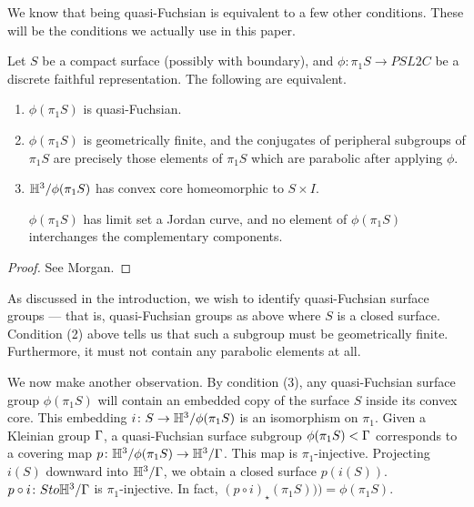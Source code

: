 We know that being quasi-Fuchsian is equivalent to a few other conditions.
These will be the conditions we actually use in this paper.

\begin{prop}

Let $S$ be a compact surface (possibly with boundary), and $\phi \colon \pi_1S
\to PSL2C$ be a discrete faithful representation. The following are equivalent.

\begin{enumerate}

\item $\phi(\pi_1S)$ is quasi-Fuchsian.

\item $\phi(\pi_1S)$ is geometrically finite, and the conjugates of peripheral
subgroups of $\pi_1S$ are precisely those elements of $\pi_1S$ which are
parabolic after applying $\phi$.

\item $\mathbb{H}^3/\phi(\pi_1S)$ has convex core homeomorphic to $S \times I$.

$\phi(\pi_1S)$ has limit set a Jordan curve, and no element of $\phi(\pi_1S)$
interchanges the complementary components.

\end{enumerate}

\end{prop}

\begin{proof}

See Morgan.%

\end{proof}

As discussed in the introduction, we wish to identify quasi-Fuchsian surface
groups --- that is, quasi-Fuchsian groups as above where $S$ is a closed
surface.  Condition (2) above tells us that such a subgroup must be
geometrically finite.  Furthermore, it must not contain any parabolic elements
at all.

We now make another observation. By condition (3), any quasi-Fuchsian surface
group $\phi(\pi_1S)$ will contain an embedded copy of the surface $S$ inside
its convex core.  This embedding $i \colon S \to \mathbb{H}^3/\phi(\pi_1S)$ is an
isomorphism on $\pi_1$.  Given a Kleinian group $\Gamma$, a quasi-Fuchsian surface
subgroup $\phi(\pi_1S) < \Gamma$ corresponds to a covering map $p \colon
\mathbb{H}^3/\phi(\pi_1S) \to \mathbb{H}^3/\Gamma$. This map is $\pi_1$-injective.  Projecting
$i(S)$ downward into $\mathbb{H}^3/\Gamma$, we obtain a closed surface $p(i(S))$. $p
\circ i \colon S to \mathbb{H}^3/\Gamma$ is $\pi_1$-injective. In fact, $(p \circ
i)_\star(\pi_1S))) = \phi(\pi_1S)$.

